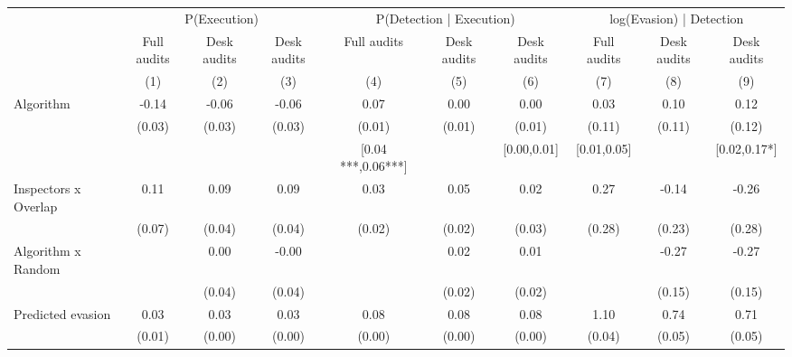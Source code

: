 \begin{tabular}{lccc|ccc|ccc} \toprule
\multicolumn{1}{l}{} & \multicolumn{3}{c}{P(Execution)} & \multicolumn{3}{c}{P(Detection | Execution)} & \multicolumn{3}{c}{log(Evasion) | Detection} \\\cmidrule(lr){2-4}\cmidrule(lr){5-7}\cmidrule(lr){8-10} \multicolumn{1}{l}{} & Full audits & Desk audits & Desk audits & Full audits & Desk audits & Desk audits & Full audits & Desk audits & Desk audits \\ \multicolumn{1}{l}{} & (1) & (2) & (3) & (4) & (5) & (6) & (7) & (8) & (9) \\ \midrule
Algorithm   &       -0.14\sym{***}&       -0.06\sym{**} &       -0.06\sym{**} &        0.07\sym{***}&        0.00         &        0.00         &        0.03         &        0.10         &        0.12         \\
            &      (0.03)         &      (0.03)         &      (0.03)         &      (0.01)         &      (0.01)         &      (0.01)         &      (0.11)         &      (0.11)         &      (0.12)         \\
\addlinespace
 & & & & [0.04 ***,0.06***] & & [0.00,0.01] & [0.01,0.05] & & [0.02,0.17*] \\  Inspectors x Overlap&        0.11         &        0.09\sym{**} &        0.09\sym{**} &        0.03         &        0.05\sym{**} &        0.02         &        0.27         &       -0.14         &       -0.26         \\
            &      (0.07)         &      (0.04)         &      (0.04)         &      (0.02)         &      (0.02)         &      (0.03)         &      (0.28)         &      (0.23)         &      (0.28)         \\
\addlinespace
Algorithm x Random&                     &        0.00         &       -0.00         &                     &        0.02         &        0.01         &                     &       -0.27\sym{*}  &       -0.27\sym{*}  \\
            &                     &      (0.04)         &      (0.04)         &                     &      (0.02)         &      (0.02)         &                     &      (0.15)         &      (0.15)         \\
\addlinespace
Predicted evasion&        0.03\sym{***}&        0.03\sym{***}&        0.03\sym{***}&        0.08\sym{***}&        0.08\sym{***}&        0.08\sym{***}&        1.10\sym{***}&        0.74\sym{***}&        0.71\sym{***}\\
            &      (0.01)         &      (0.00)         &      (0.00)         &      (0.00)         &      (0.00)         &      (0.00)         &      (0.04)         &      (0.05)         &      (0.05)         \\

\end{tabular}
